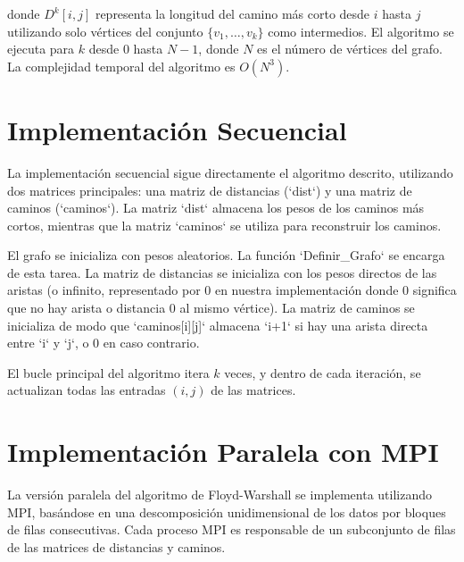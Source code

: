 \documentclass[12pt, a4paper]{article}
\begin{document}
donde $D^{k}[i, j]$ representa la longitud del camino más corto desde $i$ hasta $j$ utilizando solo vértices del conjunto $\{v_1, \dots, v_k\}$ como intermedios. El algoritmo se ejecuta para $k$ desde $0$ hasta $N-1$, donde $N$ es el número de vértices del grafo. La complejidad temporal del algoritmo es $O(N^3)$.

\section{Implementación Secuencial}
La implementación secuencial sigue directamente el algoritmo descrito, utilizando dos matrices principales: una matriz de distancias (`dist`) y una matriz de caminos (`caminos`). La matriz `dist` almacena los pesos de los caminos más cortos, mientras que la matriz `caminos` se utiliza para reconstruir los caminos.

El grafo se inicializa con pesos aleatorios. La función `Definir_Grafo` se encarga de esta tarea. La matriz de distancias se inicializa con los pesos directos de las aristas (o infinito, representado por 0 en nuestra implementación donde 0 significa que no hay arista o distancia 0 al mismo vértice). La matriz de caminos se inicializa de modo que `caminos[i][j]` almacena `i+1` si hay una arista directa entre `i` y `j`, o 0 en caso contrario.

El bucle principal del algoritmo itera $k$ veces, y dentro de cada iteración, se actualizan todas las entradas $(i, j)$ de las matrices.

\section{Implementación Paralela con MPI}
La versión paralela del algoritmo de Floyd-Warshall se implementa utilizando MPI, basándose en una descomposición unidimensional de los datos por bloques de filas consecutivas. Cada proceso MPI es responsable de un subconjunto de filas de las matrices de distancias y caminos.
\end{document}
